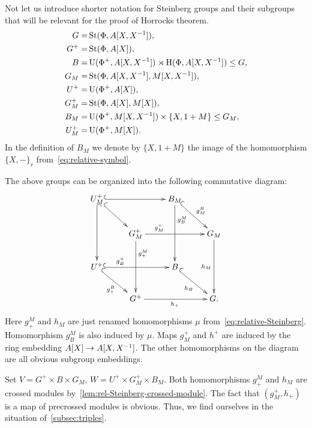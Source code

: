 Not let us introduce shorter notation for Steinberg groups and their subgroups that will be relevant for the proof of Horrocks theorem.
\begin{align*}
    G     =& \operatorname{St}(\Phi, A[X, X^{-1}]),\\
    G^+   =& \operatorname{St}(\Phi, A[X]),\\
    B     =& \operatorname{U}(\Phi^+, A[X, X^{-1}]) \rtimes \operatorname{H}(\Phi, A[X, X^{-1}]) \leq G,\\
    G_M   =& \operatorname{St}(\Phi, A[X, X^{-1}], M[X, X^{-1}]),\\
    U^+   =& \operatorname{U}(\Phi^+, A[X]),\\
    G^+_M =& \operatorname{St}(\Phi, A[X], M[X]),\\
    B_M   =& \operatorname{U}(\Phi^+, M[X, X^{-1}]) \times \{X, 1+M\} \leq G_M,\\
    U^+_M =& \operatorname{U}(\Phi^+, M[X]).
\end{align*}
In the definition of $B_M$ we denote by $\{X, 1+M\}$ the image of the homomorphism $\{X, -\}_{r}$ from~\eqref{eq:relative-symbol}.

The above groups can be organized into the following commutative diagram:
\begin{equation} \label{eq:cube-Steinberg} \xymatrix{
    U^+_M \ar@{^{(}->}[rr] \ar@{^{(}->}[dd] \ar@{^{(}->}[rd] &                        & B_M \ar[dd]^(.3){g_B^M} \ar@{^{(}->}[rd]^{g^B_M} &           \\
    & G^+_M \ar[rr]^(.3){g^+_M} \ar^(.3){g^M_+}[dd] &                   & G_M \ar[dd]_{h_M} \\
    U^+ \ar@{^{(}->}[rr]^(.3){g_B^+} \ar@{^{(}->}[rd]_{g_+^B}          &                        & B \ar@{^{(}->}[rd]_{h_B}       &           \\
    & G^+ \ar[rr]_{h_+}              &                   & G.}\end{equation}
Here $g^M_+$ and $h_M$ are just renamed homomorphisms $\mu$ from~\eqref{eq:relative-Steinberg}.
Homomorphism $g^M_B$ is also induced by $\mu$.
Maps $g_M^+$ and $h^+$ are induced by the ring embedding $A[X] \to A[X, X^{-1}]$.
The other homomorphisms on the diagram are all obvious subgroup embeddings.

Set $V = G^+\times B \times G_M$, $W = U^+\times G^+_M \times B_M$.
Both homomorphisms $g_+^M$ and $h_M$ are crossed modules by~\cref{lem:rel-Steinberg-crossed-module}.
The fact that $(g^+_M, h_+)$ is a map of precrossed modules is obvious.
Thus, we find ourselves in the situation of~\cref{subsec:triples}.

